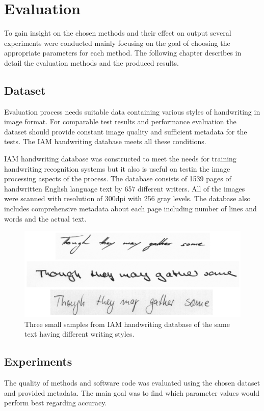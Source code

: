 \documentclass{article}
\begin{document}
  \newpage
  \section{Evaluation}
    To gain insight on the chosen methods and their effect on output several experiments were conducted mainly focusing on the goal of choosing the appropriate parameters for each method. The following chapter describes in detail the evaluation methods and the produced results.

  \subsection{Dataset}
    Evaluation process needs suitable data containing various styles of handwriting in image format. For comparable test results and performance evaluation the dataset should provide constant image quality and sufficient metadata for the tests. The IAM handwriting database meets all these conditions.

    IAM handwriting database was constructed to meet the needs for training handwriting recognition systems but it also is useful on testin the image processing aspects of the process. The database consists of 1539 pages of handwritten English language text by 657 different writers. All of the images were scanned with resolution of 300dpi with 256 gray levels. The database also includes comprehensive metadata about each page including number of lines and words and the actual text. \cite{IAM}

    \begin{figure}[!ht]
      \centering
      \includegraphics[natwidth=1530,natheight=660,scale=0.2]{iamsample.png}
      \caption{Three small samples from IAM handwriting database of the same text having different writing styles. \label{fig:iamsample} }
    \end{figure}

  \subsection{Experiments}
    The quality of methods and software code was evaluated using the chosen dataset and provided metadata. The main goal was to find which parameter values would perform best regarding accuracy.
\end{document}

